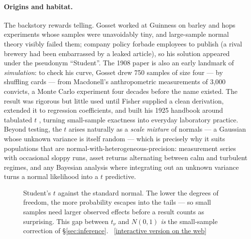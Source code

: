 \documentclass[11pt]{article}
\numberwithin{equation}{section}
\newcommand{\siteurl}{https://sanya-shopper.github.io/distribs/}
\newcommand{\webfig}[1]{{\small\sffamily\color{inkS}%
  [\href{\siteurl\##1}{interactive version on the web}]}}
\begin{document}
\paragraph{Origins and habitat.}
The backstory rewards telling.  Gosset worked at Guinness on barley and
hops experiments whose samples were unavoidably tiny, and large-sample
normal theory visibly failed them; company policy forbade employees to
publish (a rival brewery had been embarrassed by a leaked article), so
his solution appeared under the pseudonym ``Student''.  The 1908 paper is
also an early landmark of \emph{simulation}: to check his curve, Gosset
drew 750 samples of size four --- by shuffling cards --- from Macdonell's
anthropometric measurements of 3{,}000 convicts, a Monte Carlo experiment
four decades before the name existed.  The result was rigorous but
little used until Fisher supplied a clean derivation, extended it to
regression coefficients, and built his 1925 handbook around tabulated
$t$ \citep{fisher1925}, turning small-sample exactness into everyday
laboratory practice.  Beyond testing, the $t$ arises naturally as a
\emph{scale mixture} of normals --- a Gaussian whose unknown variance is
itself random --- which is precisely why it suits populations that are
normal-with-heterogeneous-precision: measurement series with occasional
sloppy runs, asset returns alternating between calm and turbulent
regimes, and any Bayesian analysis where integrating out an unknown
variance turns a normal likelihood into a $t$ predictive.

\begin{figure}[htbp]
\centering
{}
\caption{Student's $t$ against the standard normal.  The lower the degrees
of freedom, the more probability escapes into the tails --- so small
samples need larger observed effects before a result counts as
surprising.  This gap between $t_\nu$ and $N(0,1)$ \emph{is} the
small-sample correction of \S\ref{sec:inference}.\ \webfig{studentt}}
\label{fig:tvsn}
\end{figure}
\end{document}
